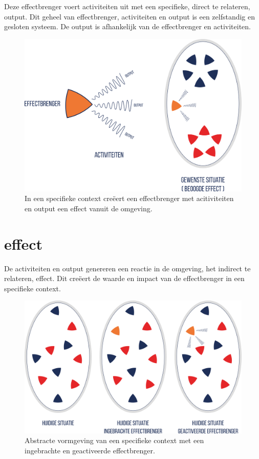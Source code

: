 \documentclass[
]{book}
\begin{document}
Deze effectbrenger voert activiteiten uit met een specifieke, direct te relateren, output. Dit geheel van effectbrenger, activiteiten en output is een zelfstandig en gesloten systeem. De output is afhankelijk van de effectbrenger en activiteiten.

\begin{figure}

{\centering \includegraphics[width=0.45\linewidth]{data/images/20210324-MDI-effectbrenger-ei} 

}

\caption{In een specifieke context creëert een effectbrenger met acitiviteiten en output een effect vanuit de omgeving.}\label{fig:effectbrenger-met-ei}
\end{figure}

\hypertarget{effect}{%
\section{effect}\label{effect}}

De activiteiten en output genereren een reactie in de omgeving, het indirect te relateren, effect. Dit creëert de waarde en impact van de effectbrenger in een specifieke context.

\begin{figure}

{\centering \includegraphics[width=0.85\linewidth]{data/images/20210324-MDI-eieren-huidig} 

}

\caption{Abstracte vormgeving van een specifieke context met een ingebrachte en geactiveerde effectbrenger.}\label{fig:effectbrenger-in-eieren}
\end{figure}
\end{document}
